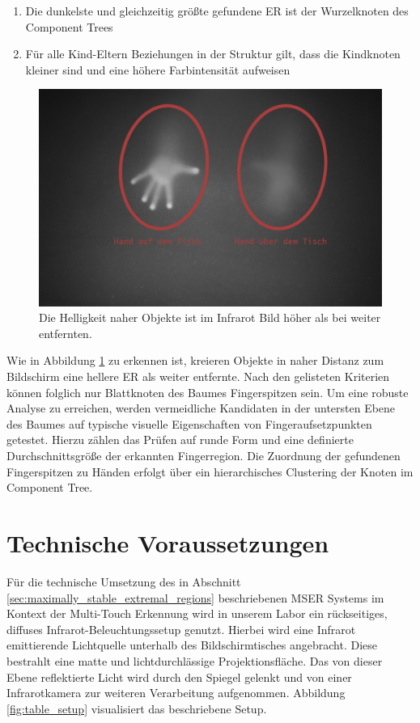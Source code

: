 \begin{enumerate}
\item Die dunkelste und gleichzeitig größte gefundene ER ist der Wurzelknoten des Component Trees
\item Für alle Kind-Eltern Beziehungen in der Struktur gilt, dass die Kindknoten kleiner sind und eine höhere Farbintensität aufweisen
\end{enumerate}

\begin{figure}
	\begin{center}
		\includegraphics[width=12cm]{img/mser_2.pdf}
	\end{center}
	\caption{Die Helligkeit naher Objekte ist im Infrarot Bild höher als bei weiter entfernten.}
	\label{fig:mser_2}
\end{figure}

Wie in Abbildung \ref{fig:mser_2} zu erkennen ist, kreieren Objekte in naher Distanz zum Bildschirm eine hellere ER als weiter entfernte. Nach den gelisteten Kriterien können folglich nur Blattknoten des Baumes Fingerspitzen sein. Um eine robuste Analyse zu erreichen, werden vermeidliche Kandidaten in der untersten Ebene des Baumes auf typische visuelle Eigenschaften von Fingeraufsetzpunkten getestet. Hierzu zählen das Prüfen auf runde Form und eine definierte Durchschnittsgröße der erkannten Fingerregion. Die Zuordnung der gefundenen Fingerspitzen zu Händen erfolgt über ein hierarchisches Clustering der Knoten im Component Tree.


\section{Technische Voraussetzungen}
\label{sec:technische_voraussetzungen}

Für die technische Umsetzung des in Abschnitt \ref{sec:maximally_stable_extremal_regions} beschriebenen MSER Systems im Kontext der Multi-Touch Erkennung wird in unserem Labor ein rückseitiges, diffuses Infrarot-Beleuchtungssetup genutzt. Hierbei wird eine Infrarot emittierende Lichtquelle unterhalb des Bildschirmtisches angebracht. Diese bestrahlt eine matte und lichtdurchlässige Projektionsfläche. Das von dieser Ebene reflektierte Licht wird durch den Spiegel gelenkt und von einer Infrarotkamera zur weiteren Verarbeitung aufgenommen. Abbildung \ref{fig:table_setup} visualisiert das beschriebene Setup.

